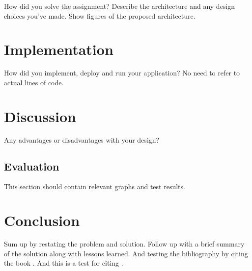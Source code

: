 How did you solve the assignment? Describe the architecture and any design
choices you've made. Show figures of the proposed architecture.

\section{Implementation}

How did you implement, deploy and run your application? No need to refer to
actual lines of code.

\section{Discussion}

Any advantages or disadvantages with your design?

\subsection{Evaluation}

This section should contain relevant graphs and test results.

\section{Conclusion}

Sum up by restating the problem and solution. Follow up with a brief summary of
the solution along with lessons learned.
And testing the bibliography by citing the book \cite{robert98}.
And this is a test for citing \cite{MOS}.



\newpage{}





